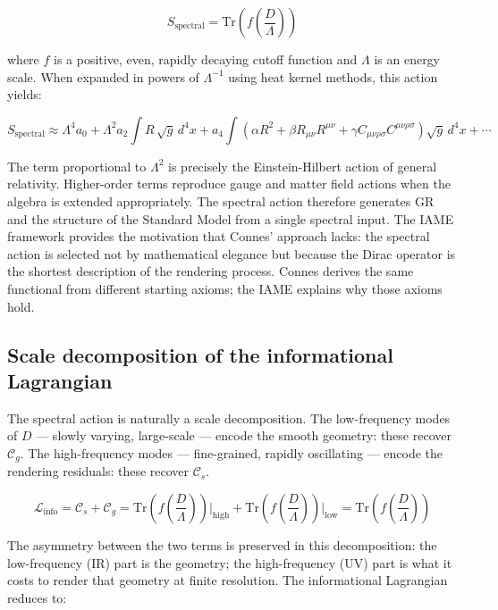 \documentclass[12pt,a4paper]{article}
\newcommand{\iame}{\textsc{IAME}}
\newcommand{\Linfo}{\mathcal{L}_{\mathrm{info}}}
\newcommand{\Cs}{\mathcal{C}_s}
\newcommand{\Cg}{\mathcal{C}_g}
\begin{document}
\begin{equation}
S_{\mathrm{spectral}} = \mathrm{Tr}\!\left(f\!\left(\frac{D}{\Lambda}\right)\right)
\end{equation}

where $f$ is a positive, even, rapidly decaying cutoff function and $\Lambda$
is an energy scale. When expanded in powers of $\Lambda^{-1}$ using heat
kernel methods, this action yields:

\begin{equation}
S_{\mathrm{spectral}} \approx \Lambda^4 a_0 + \Lambda^2 a_2 \int R\,\sqrt{g}\,d^4x
+ a_4 \int \left(\alpha R^2 + \beta R_{\mu\nu}R^{\mu\nu}
+ \gamma C_{\mu\nu\rho\sigma}C^{\mu\nu\rho\sigma}\right)\sqrt{g}\,d^4x + \cdots
\end{equation}

The term proportional to $\Lambda^2$ is precisely the Einstein-Hilbert action
of general relativity. Higher-order terms reproduce gauge and matter field
actions when the algebra is extended appropriately. The spectral action
therefore generates GR and the structure of the Standard Model from a single
spectral input. The \iame{} framework provides the motivation that Connes'
approach lacks: the spectral action is selected not by mathematical elegance
but because the Dirac operator is the shortest description of the rendering
process. Connes derives the same functional from different starting axioms;
the \iame{} explains why those axioms hold.

\subsection*{Scale decomposition of the informational Lagrangian}

The spectral action is naturally a scale decomposition. The low-frequency
modes of $D$ --- slowly varying, large-scale --- encode the smooth geometry:
these recover $\Cg$. The high-frequency modes --- fine-grained, rapidly
oscillating --- encode the rendering residuals: these recover $\Cs$.

\begin{equation}
\boxed{
\Linfo = \Cs + \Cg
= \mathrm{Tr}\!\left(f\!\left(\frac{D}{\Lambda}\right)\right)\!\bigg|_{\mathrm{high}}
+ \mathrm{Tr}\!\left(f\!\left(\frac{D}{\Lambda}\right)\right)\!\bigg|_{\mathrm{low}}
= \mathrm{Tr}\!\left(f\!\left(\frac{D}{\Lambda}\right)\right)
}
\end{equation}

The asymmetry between the two terms is preserved in this decomposition: the
low-frequency (IR) part is the geometry; the high-frequency (UV) part is what
it costs to render that geometry at finite resolution. The informational
Lagrangian reduces to:
\end{document}
